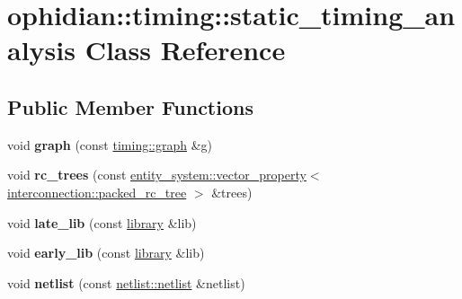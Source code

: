 \hypertarget{classophidian_1_1timing_1_1static__timing__analysis}{\section{ophidian\-:\-:timing\-:\-:static\-\_\-timing\-\_\-analysis Class Reference}
\label{classophidian_1_1timing_1_1static__timing__analysis}
}
\subsection*{Public Member Functions}
\begin{DoxyCompactItemize}
\item 
\hypertarget{classophidian_1_1timing_1_1static__timing__analysis_a1ec4043e2d269b5a8c637d09464a3454}{void {\bfseries graph} (const \hyperlink{classophidian_1_1timing_1_1graph}{timing\-::graph} \&g)}\label{classophidian_1_1timing_1_1static__timing__analysis_a1ec4043e2d269b5a8c637d09464a3454}

\item 
\hypertarget{classophidian_1_1timing_1_1static__timing__analysis_a0b8730a643e02468274060bd00715d2d}{void {\bfseries rc\-\_\-trees} (const \hyperlink{classophidian_1_1entity__system_1_1vector__property}{entity\-\_\-system\-::vector\-\_\-property}$<$ \hyperlink{classophidian_1_1interconnection_1_1packed__rc__tree}{interconnection\-::packed\-\_\-rc\-\_\-tree} $>$ \&trees)}\label{classophidian_1_1timing_1_1static__timing__analysis_a0b8730a643e02468274060bd00715d2d}

\item 
\hypertarget{classophidian_1_1timing_1_1static__timing__analysis_a2d883dfeb217ef975052f4f106d253b3}{void {\bfseries late\-\_\-lib} (const \hyperlink{classophidian_1_1timing_1_1library}{library} \&lib)}\label{classophidian_1_1timing_1_1static__timing__analysis_a2d883dfeb217ef975052f4f106d253b3}

\item 
\hypertarget{classophidian_1_1timing_1_1static__timing__analysis_ab575b843a38a4d8e019ddaf746b4f050}{void {\bfseries early\-\_\-lib} (const \hyperlink{classophidian_1_1timing_1_1library}{library} \&lib)}\label{classophidian_1_1timing_1_1static__timing__analysis_ab575b843a38a4d8e019ddaf746b4f050}

\item 
\hypertarget{classophidian_1_1timing_1_1static__timing__analysis_a85ed618eaa5f2860648e4d4f4e2cf8e2}{void {\bfseries netlist} (const \hyperlink{classophidian_1_1netlist_1_1netlist}{netlist\-::netlist} \&netlist)}\label{classophidian_1_1timing_1_1static__timing__analysis_a85ed618eaa5f2860648e4d4f4e2cf8e2}


\end{DoxyCompactItemize}
